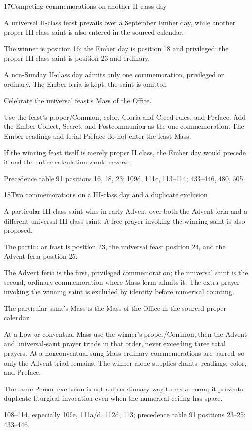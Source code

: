 \begin{casefile}{17}{Competing commemorations on another II-class day}
\item[Calendar facts] A universal II-class feast prevails over a September Ember day, while another proper III-class saint is also entered in the sourced calendar.
\item[Ranks and rows] The winner is position 16; the Ember day is position 18 and privileged; the proper III-class saint is position 23 and ordinary.
\item[Impeded item] A non-Sunday II-class day admits only one commemoration, privileged or ordinary.  The Ember feria is kept; the saint is omitted.
\item[Mass category] Celebrate the universal feast's Mass of the Office.
\item[Assembly] Use the feast's proper/Common, color, Gloria and Creed rules, and Preface.  Add the Ember Collect, Secret, and Postcommunion as the one commemoration.  The Ember readings and ferial Preface do not enter the feast Mass.
\item[Boundary] If the winning feast itself is merely proper II class, the Ember day would precede it and the entire calculation would reverse.
\item[Rubric locus] Precedence table 91 positions 16, 18, 23; 109d, 111c, 113--114; 433--446, 480, 505.
\end{casefile}

\begin{casefile}{18}{Two commemorations on a III-class day and a duplicate exclusion}
\item[Calendar facts] A particular III-class saint wins in early Advent over both the Advent feria and a different universal III-class saint.  A free prayer invoking the winning saint is also proposed.
\item[Ranks and rows] The particular feast is position 23, the universal feast position 24, and the Advent feria position 25.
\item[Impeded item] The Advent feria is the first, privileged commemoration; the universal saint is the second, ordinary commemoration where Mass form admits it.  The extra prayer invoking the winning saint is excluded by identity before numerical counting.
\item[Mass category] The particular saint's Mass is the Mass of the Office in the sourced proper calendar.
\item[Assembly] At a Low or conventual Mass use the winner's proper/Common, then the Advent and universal-saint prayer triads in that order, never exceeding three total prayers.  At a nonconventual sung Mass ordinary commemorations are barred, so only the Advent triad remains.  The winner alone supplies chants, readings, color, and Preface.
\item[Boundary] The same-Person exclusion is not a discretionary way to make room; it prevents duplicate liturgical invocation even when the numerical ceiling has space.
\item[Rubric locus] 108--114, especially 109e, 111a/d, 112d, 113; precedence table 91 positions 23--25; 433--446.
\end{casefile}
